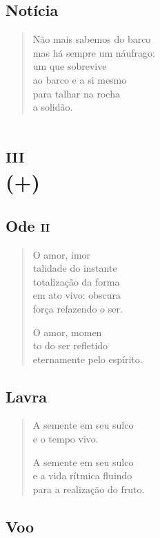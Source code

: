 \chapter{Notícia}

\begin{verse}
Não mais sabemos do barco\\
mas há sempre um náufrago:\\
um que sobrevive\\
ao barco e a si mesmo\\
para talhar na rocha\\
a solidão.
\end{verse}


\part*{\textsc{iii}\\(+)}

\chapter{Ode \textsc{ii}}

\begin{verse}
O amor, imor\\
talidade do instante\\
totalização da forma\\
em ato vivo: obscura\\
força refazendo o ser.

O amor, momen\\
to do ser refletido\\
eternamente pelo espírito.
\end{verse}

\chapter{Lavra}

\begin{verse}
A semente em seu sulco\\
e o tempo vivo.

A semente em seu sulco\\
e a vida rítmica fluindo\\
para a realização do fruto.
\end{verse}

\chapter{Voo}

